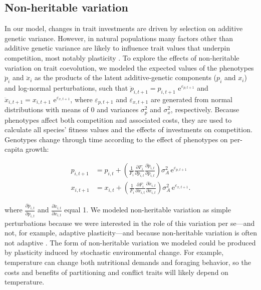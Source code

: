 \subsection*{Non-heritable variation}

In our model, changes in trait investments are driven by selection on
additive genetic variance. However, in natural populations many factors other
than additive genetic variance are likely to influence trait values that
underpin competition, most notably plasticity \citep{Miner2005}.
To explore the effects of non-heritable variation on trait coevolution, we
modeled the expected values of the phenotypes ${\ddot{p}}_{i}$ and
${\ddot{x}}_{i}$ as the products of the latent additive-genetic
components ($p_{i}$ and $x_{i}$) and log-normal perturbations, such
that
${\ddot{p}}_{i,t + 1} = p_{i,t + 1}\mspace{6mu}\text{e}^{\varepsilon_{p,t + 1}}$
and
${\ddot{x}}_{i,t + 1} = x_{i,t + 1}\mspace{6mu}\text{e}^{\varepsilon_{x,t + 1}}$,
where $\varepsilon_{p,t + 1}$ and $\varepsilon_{x,t + 1}$ are
generated from normal distributions with means of 0 and variances
$\sigma_{p}^{2}$ and $\sigma_{x}^{2}$, respectively. Because
phenotypes affect both competition and associated costs, they are used
to calculate all species' fitness values and the effects of investments
on competition. Genotypes change through time according to the effect of
phenotypes on per-capita growth:


\begin{equation} \label{eq:invest-change-non-heritable}
\begin{split}
    p_{i,t+1} &= p_{i,t} + \left( \frac{1}{F_i}
            \frac{\partial F_i}{\partial \ddot{p}_{i,t}}
            \frac{\partial \ddot{p}_{i,t}}{\partial {p}_{i,t}}
        \right) \sigma^2_A \, \text{e}^{\varepsilon_{p,t+1}} \\
    x_{i,t+1} &= x_{i,t} + \left( \frac{1}{F_i}
            \frac{\partial F_i}{\partial \ddot{x}_{i,t}} 
            \frac{\partial \ddot{x}_{i,t}}{\partial {x}_{i,t}} 
        \right) \sigma^2_A \, \text{e}^{\varepsilon_{x,t+1}}
    \textrm{.}
\end{split}
\end{equation}

\noindent where $\frac{\partial{\ddot{p}}_{i,t}}{\partial p_{i,t}}$ and
$\frac{\partial{\ddot{x}}_{i,t}}{\partial x_{i,t}}$ equal 1. We
modeled non-heritable variation as simple perturbations because we were
interested in the role of this variation per se---and not, for example,
adaptive plasticity---and because non-heritable variation is often not
adaptive \citep{Ghalambor2007, Miner2005}. The form of
non-heritable variation we modeled could be produced by plasticity induced
by stochastic environmental change. For example, temperature can change
both nutritional demands and foraging behavior, so the costs and
benefits of partitioning and conflict traits will likely depend on
temperature.

